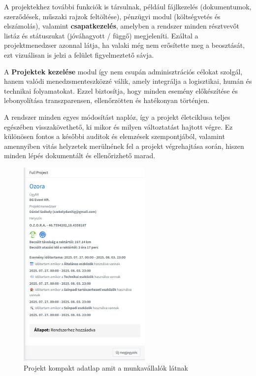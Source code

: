 A projektekhez további funkciók is társulnak, például fájlkezelés (dokumentumok, szerződések, műszaki rajzok feltöltése), pénzügyi modul (költségvetés és elszámolás), 
valamint \textbf{csapatkezelés}, amelyben a rendszer minden résztvevőt listáz és státuszukat (jóváhagyott / függő) megjeleníti.  
Ezáltal a projektmenedzser azonnal látja, ha valaki még nem erősítette meg a beosztását, ezt vizuálisan is jelzi a felület figyelmeztető sávja.

A \textbf{Projektek kezelése} modul így nem csupán adminisztrációs célokat szolgál, hanem valódi menedzsmenteszközzé válik, 
amely integrálja a logisztikai, humán és technikai folyamatokat.  
Ezzel biztosítja, hogy minden esemény előkészítése és lebonyolítása transzparensen, ellenőrzötten és hatékonyan történjen.

A rendszer minden egyes módosítást naplóz, így a projekt életciklusa teljes egészében visszakövethető, ki mikor és milyen változtatást hajtott végre.  
Ez különösen fontos a későbbi auditok és elemzések szempontjából, valamint amennyiben vitás helyzetek merülnének fel a projekt végrehajtása során,
hiszen minden lépés dokumentált és ellenőrizhető marad.
\begin{figure}[H]
    \centering
    \includegraphics[width=65mm, keepaspectratio]{figures/project_card.jpg}
    \caption{Projekt kompakt adatlap amit a munkavállalók látnak}
    \label{fig:project_card}
\end{figure}
